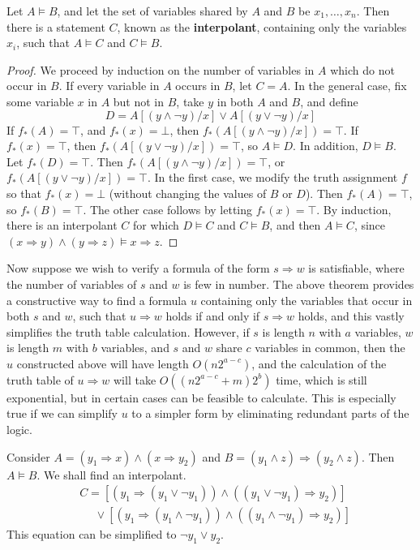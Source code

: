 \begin{theorem}
    Let $A \vDash B$, and let the set of variables shared by $A$ and $B$ be $x_1, \dots, x_n$. Then there is a statement $C$, known as the {\bf interpolant}, containing only the variables $x_i$, such that $A \vDash C$ and $C \vDash B$.
\end{theorem}
\begin{proof}
    We proceed by induction on the number of variables in $A$ which do not occur in $B$. If every variable in $A$ occurs in $B$, let $C = A$. In the general case, fix some variable $x$ in $A$ but not in $B$, take $y$ in both $A$ and $B$, and define
    \[ D = A[(y \wedge \neg y)/x] \vee A[(y \vee \neg y)/x] \]
    If $f_*(A) = \top$, and $f_*(x) = \bot$, then $f_*(A[(y \wedge \neg y)/x]) = \top$. If $f_*(x) = \top$, then $f_*(A[(y \vee \neg y)/x]) = \top$, so $A \vDash D$. In addition, $D \vDash B$. Let $f_*(D) = \top$. Then $f_*(A[(y \wedge \neg y)/x]) = \top$, or $f_*(A[(y \vee \neg y)/x]) = \top$. In the first case, we modify the truth assignment $f$ so that $f_*(x) = \bot$ (without changing the values of $B$ or $D$). Then $f_*(A) = \top$, so $f_*(B) = \top$. The other case follows by letting $f_*(x) = \top$. By induction, there is an interpolant $C$ for which $D \vDash C$ and $C \vDash B$, and then $A \vDash C$, since $(x \Rightarrow y) \wedge (y \Rightarrow z) \vDash x \Rightarrow z$.
\end{proof}

Now suppose we wish to verify a formula of the form $s \Rightarrow w$ is satisfiable, where the number of variables of $s$ and $w$ is few in number. The above theorem provides a constructive way to find a formula $u$ containing only the variables that occur in both $s$ and $w$, such that $u \Rightarrow w$ holds if and only if $s \Rightarrow w$ holds, and this vastly simplifies the truth table calculation. However, if $s$ is length $n$ with $a$ variables, $w$ is length $m$ with $b$ variables, and $s$ and $w$ share $c$ variables in common, then the $u$ constructed above will have length $O(n2^{a-c})$, and the calculation of the truth table of $u \Rightarrow w$ will take $O((n2^{a-c} + m)2^b)$ time, which is still exponential, but in certain cases can be feasible to calculate. This is especially true if we can simplify $u$ to a simpler form by eliminating redundant parts of the logic.

\begin{example}
    Consider $A = (y_1 \Rightarrow x) \wedge (x \Rightarrow y_2)$ and $B = (y_1 \wedge z) \Rightarrow (y_2 \wedge z)$. Then $A \vDash B$. We shall find an interpolant.
    \begin{align*}
        &C = [(y_1 \Rightarrow (y_1 \vee \neg y_1)) \wedge ((y_1 \vee \neg y_1) \Rightarrow y_2)]\\
        &\ \ \ \ \ \ \vee [(y_1 \Rightarrow (y_1 \wedge \neg y_1)) \wedge ((y_1 \wedge \neg y_1) \Rightarrow y_2)]
    \end{align*}
    This equation can be simplified to $\neg y_1 \vee y_2$.
\end{example}

